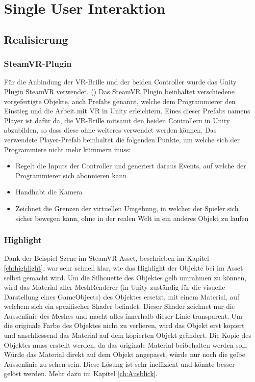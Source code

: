 \chapter{Single User Interaktion}
\label{ch:Single_User_Interaktion}

\section{Realisierung}

\subsection{SteamVR-Plugin}
\label{ch:steamvr_plugin}

Für die Anbindung der VR-Brille und der beiden Controller wurde das Unity Plugin SteamVR verwendet. (\cite{noauthor_steamvr_2019}) Das SteamVR Plugin beinhaltet verschiedene vorgefertigte Objekte, auch Prefabs genannt, welche dem Programmierer den Einstieg und die Arbeit mit VR in Unity erleichtern. Eines dieser Prefabs namens \grqq Player\grqq{} ist dafür da, die VR-Brille mitsamt den beiden Controllern in Unity abzubilden, so dass diese ohne weiteres verwendet werden können. 
Das verwendete \grqq Player\grqq-Prefab beinhaltet die folgenden Punkte, um welche sich der Programmiere nicht mehr kümmern muss:

\begin{itemize} [itemsep=1pt,topsep=0pt]
	\item Regelt die Inputs der Controller und generiert daraus Events, auf welche der Programmierer sich abonnieren kann
	\item Handhabt die Kamera
	\item Zeichnet die Grenzen der virtuellen Umgebung, in welcher der Spieler sich sicher bewegen kann, ohne in der realen Welt in ein anderes Objekt zu laufen
\end{itemize}
 

\subsection{Highlight}
\label{ch:highlight_realisierung}
Dank der Beispiel Szene im SteamVR Asset, beschrieben im Kapitel \ref{ch:highlight}, war sehr schnell klar, wie das Highlight der Objekte bei im Asset selbst gemacht wird. Um die Silhouette des Objektes gelb umrahmen zu können, wird das Material aller MeshRenderer (in Unity zuständig für die visuelle Darstellung eines GameObjects) des Objektes ersetzt, mit einem Material, auf welchem sich ein spezifischer Shader befindet. Dieser Shader zeichnet nur die Aussenlinie des Meshes und macht alles innerhalb dieser Linie transparent. Um die originale Farbe des Objektes nicht zu verlieren, wird das Objekt erst kopiert und anschliessend das Material auf dem kopierten Objekt geändert. Die Kopie des Objektes muss erstellt werden, da das originale Material beibehalten werden soll. Würde das Material direkt auf dem Objekt angepasst, würde nur noch die gelbe Aussenlinie zu sehen sein. Diese Lösung ist sehr ineffizient und könnte besser gelöst werden. Mehr dazu im Kapitel \ref{ch:Ausblick}. \\

